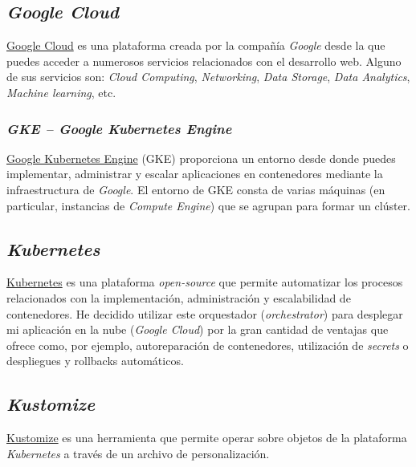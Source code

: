 \documentclass[
]{article}
\begin{document}
\hypertarget{google-cloud}{%
\subsection{\texorpdfstring{\emph{Google
Cloud}}{Google Cloud}}\label{google-cloud}}

\href{https://cloud.google.com/}{Google Cloud} es una plataforma creada
por la compañía \emph{Google} desde la que puedes acceder a numerosos
servicios relacionados con el desarrollo web. Alguno de sus servicios
son: \emph{Cloud Computing}, \emph{Networking}, \emph{Data Storage},
\emph{Data Analytics}, \emph{Machine learning}, etc.

\hypertarget{gke-google-kubernetes-engine}{%
\subsubsection{\texorpdfstring{\emph{GKE -- Google Kubernetes
Engine}}{GKE -- Google Kubernetes Engine}}\label{gke-google-kubernetes-engine}}

\href{https://cloud.google.com/kubernetes-engine}{Google Kubernetes
Engine} (GKE) proporciona un entorno desde donde puedes implementar,
administrar y escalar aplicaciones en contenedores mediante la
infraestructura de \emph{Google}. El entorno de GKE consta de varias
máquinas (en particular, instancias de \emph{Compute Engine}) que se
agrupan para formar un clúster.

\hypertarget{kubernetes}{%
\subsection{\texorpdfstring{\emph{Kubernetes}}{Kubernetes}}\label{kubernetes}}

\href{https://kubernetes.io/es/}{Kubernetes} es una plataforma
\emph{open-source} que permite automatizar los procesos relacionados con
la implementación, administración y escalabilidad de contenedores. He
decidido utilizar este orquestador (\emph{orchestrator}) para desplegar
mi aplicación en la nube (\emph{Google Cloud}) por la gran cantidad de
ventajas que ofrece como, por ejemplo, autoreparación de contenedores,
utilización de \emph{secrets} o despliegues y rollbacks automáticos.

\hypertarget{kustomize}{%
\subsection{\texorpdfstring{\emph{Kustomize}}{Kustomize}}\label{kustomize}}

\href{https://github.com/kubernetes-sigs/kustomize}{Kustomize} es una
herramienta que permite operar sobre objetos de la plataforma
\emph{Kubernetes} a través de un archivo de personalización.
\end{document}
